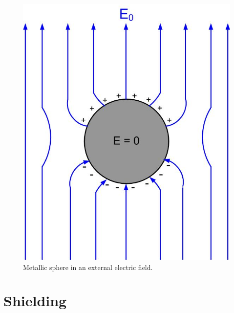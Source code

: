 \documentclass{ximera}
\begin{document}
\begin{figure}[htbp]
\begin{center}
\includegraphics[scale=0.5]{../jpg/metalsphereinefield.jpg}
\end{center}
\caption{Metallic sphere in an external electric field.}
\label{fig:Grounding}
\end{figure}



\section{Shielding}
\end{document}
